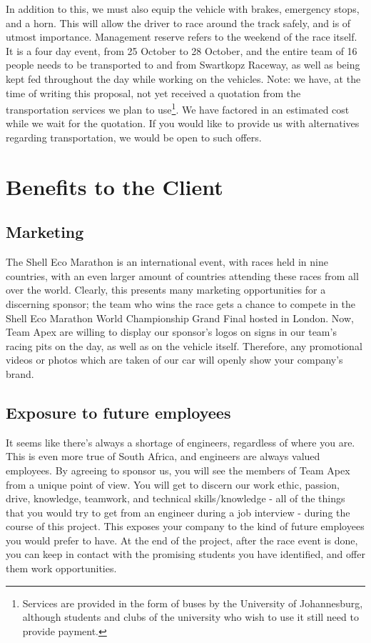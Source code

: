 \documentclass[a4paper, 12pt]{article}
\begin{document}
		In addition to this, we must also equip the vehicle with brakes, emergency stops, and a horn. This will allow the driver to race around the track safely, and is of utmost importance. Management reserve refers to the weekend of the race itself. It is a four day event, from 25 October to 28 October, and the entire team of 16 people needs to be transported to and from Swartkopz Raceway, as well as being kept fed throughout the day while working on the vehicles. Note: we have, at the time of writing this proposal, not yet received a quotation from the transportation services we plan to use\footnote{Services are provided in the form of buses by the University of Johannesburg, although students and clubs of the university who wish to use it still need to provide payment.}. We have factored in an estimated cost while we wait for the quotation. If you would like to provide us with alternatives regarding transportation, we would be open to such offers.

	\section{Benefits to the Client} %
	\label{sec:benefits_to_the_client}
		\subsection{Marketing} %
		\label{sub:marketing}
			The Shell Eco Marathon is an international event, with races held in nine countries, with an even larger amount of countries attending these races from all over the world. Clearly, this presents many marketing opportunities for a discerning sponsor; the team who wins the race gets a chance to compete in the Shell Eco Marathon World Championship Grand Final hosted in London. Now, Team Apex are willing to display our sponsor's logos on signs in our team's racing pits on the day, as well as on the vehicle itself. Therefore, any promotional videos or photos which are taken of our car will openly show your company's brand.
		
		\subsection{Exposure to future employees} %
		\label{sub:exposure_to_future_employees}
			It seems like there's always a shortage of engineers, regardless of where you are. This is even more true of South Africa, and engineers are always valued employees. By agreeing to sponsor us, you will see the members of Team Apex from a unique point of view. You will get to discern our work ethic, passion, drive, knowledge, teamwork, and technical skills/knowledge - all of the things that you would try to get from an engineer during a job interview - during the course of this project. This exposes your company to the kind of future employees you would prefer to have. At the end of the project, after the race event is done, you can keep in contact with the promising students you have identified, and offer them work opportunities.
\end{document}
